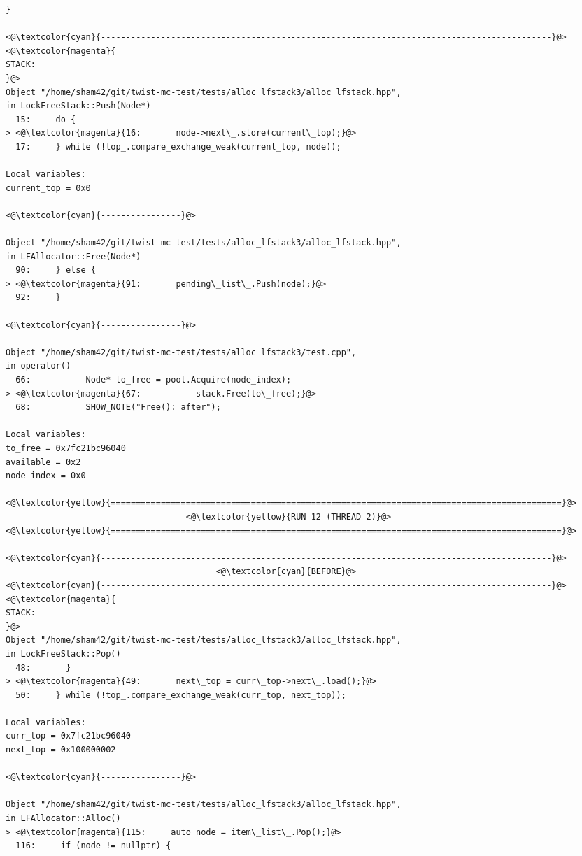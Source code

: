\begin{adjustwidth}{-3.3cm}{-1cm}
\begin{allintypewriter}
\begin{multicols*}{2}
\begin{lstlisting}[numbers=none]
    }

<@\textcolor{cyan}{------------------------------------------------------------------------------------------}@>
<@\textcolor{magenta}{
STACK:
}@>
Object "/home/sham42/git/twist-mc-test/tests/alloc_lfstack3/alloc_lfstack.hpp",
in LockFreeStack::Push(Node*)
  15:     do {
> <@\textcolor{magenta}{16:       node->next\_.store(current\_top);}@>
  17:     } while (!top_.compare_exchange_weak(current_top, node));

Local variables: 
current_top = 0x0

<@\textcolor{cyan}{----------------}@>

Object "/home/sham42/git/twist-mc-test/tests/alloc_lfstack3/alloc_lfstack.hpp",
in LFAllocator::Free(Node*)
  90:     } else {
> <@\textcolor{magenta}{91:       pending\_list\_.Push(node);}@>
  92:     }

<@\textcolor{cyan}{----------------}@>

Object "/home/sham42/git/twist-mc-test/tests/alloc_lfstack3/test.cpp",
in operator()
  66:           Node* to_free = pool.Acquire(node_index);
> <@\textcolor{magenta}{67:           stack.Free(to\_free);}@>
  68:           SHOW_NOTE("Free(): after");

Local variables: 
to_free = 0x7fc21bc96040
available = 0x2
node_index = 0x0

<@\textcolor{yellow}{==========================================================================================}@>
                                    <@\textcolor{yellow}{RUN 12 (THREAD 2)}@>
<@\textcolor{yellow}{==========================================================================================}@>

<@\textcolor{cyan}{------------------------------------------------------------------------------------------}@>
                                          <@\textcolor{cyan}{BEFORE}@>
<@\textcolor{cyan}{------------------------------------------------------------------------------------------}@>
<@\textcolor{magenta}{
STACK:
}@>
Object "/home/sham42/git/twist-mc-test/tests/alloc_lfstack3/alloc_lfstack.hpp",
in LockFreeStack::Pop()
  48:       }
> <@\textcolor{magenta}{49:       next\_top = curr\_top->next\_.load();}@>
  50:     } while (!top_.compare_exchange_weak(curr_top, next_top));

Local variables: 
curr_top = 0x7fc21bc96040
next_top = 0x100000002

<@\textcolor{cyan}{----------------}@>

Object "/home/sham42/git/twist-mc-test/tests/alloc_lfstack3/alloc_lfstack.hpp",
in LFAllocator::Alloc()
> <@\textcolor{magenta}{115:     auto node = item\_list\_.Pop();}@>
  116:     if (node != nullptr) {


\end{lstlisting}
\end{multicols*}
\end{allintypewriter}
\end{adjustwidth}
